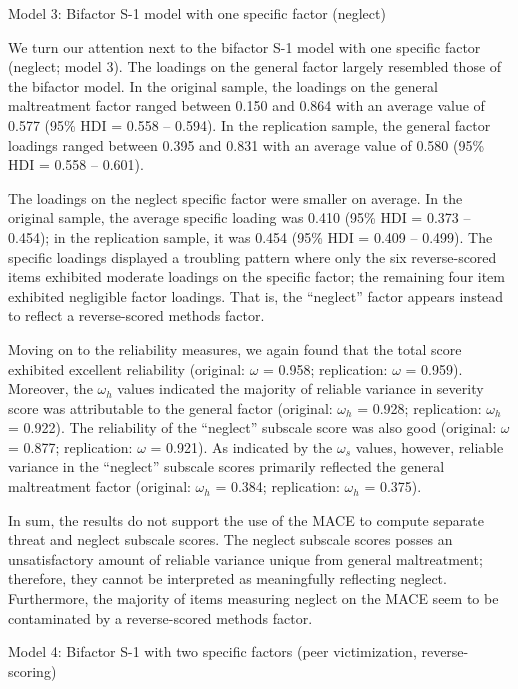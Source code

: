\documentclass[letterpaper,man,natbib,noextraspace,floatsintext,longtable,12pt]{apa6}
\makeatletter
\renewcommand{\subsubsection}{\@startsection{subsubsection}{3}
  {\z@}%
  {\b@level@two@skip}{\e@level@two@skip}%
  {\normalfont\normalsize\bfseries}}
\makeatother
\begin{document}
\subsubsection{Model 3: Bifactor S-1 model with one specific factor (neglect)}

We turn our attention next to the bifactor S-1 model with one specific factor (neglect; model 3). The loadings on the general factor largely resembled those of the bifactor model. In the original sample, the loadings on the general maltreatment factor ranged between 0.150 and 0.864 with an average value of 0.577 (95\% HDI = 0.558 -- 0.594). In the replication sample, the general factor loadings ranged between 0.395 and 0.831 with an average value of 0.580 (95\% HDI = 0.558 -- 0.601). 

The loadings on the neglect specific factor were smaller on average. In the original sample, the average specific loading was 0.410 (95\% HDI = 0.373 -- 0.454); in the replication sample, it was 0.454 (95\% HDI = 0.409 -- 0.499). The specific loadings displayed a troubling pattern where only the six reverse-scored items exhibited moderate loadings on the specific factor; the remaining four item exhibited negligible factor loadings. That is, the ``neglect'' factor appears instead to reflect a reverse-scored methods factor.

Moving on to the reliability measures, we again found that the total score exhibited excellent reliability (original: $\omega$ = 0.958; replication: $\omega$ = 0.959). Moreover, the $\omega_h$ values indicated the majority of reliable variance in severity score was attributable to the general factor (original: $\omega_h$ = 0.928; replication: $\omega_h$ = 0.922). The reliability of the ``neglect'' subscale score was also good (original: $\omega$ = 0.877; replication: $\omega$ = 0.921). As indicated by the $\omega_s$ values, however, reliable variance in the ``neglect'' subscale scores primarily reflected the general maltreatment factor (original: $\omega_h$ = 0.384; replication: $\omega_h$ = 0.375). 

In sum, the results do not support the use of the MACE to compute separate threat and neglect subscale scores. The neglect subscale scores posses an unsatisfactory amount of reliable variance unique from general maltreatment; therefore, they cannot be interpreted as meaningfully reflecting neglect. Furthermore, the majority of items measuring neglect on the MACE seem to be contaminated by a reverse-scored methods factor.

\subsubsection{Model 4: Bifactor S-1 with two specific factors (peer victimization, reverse- scoring)}
\end{document}
